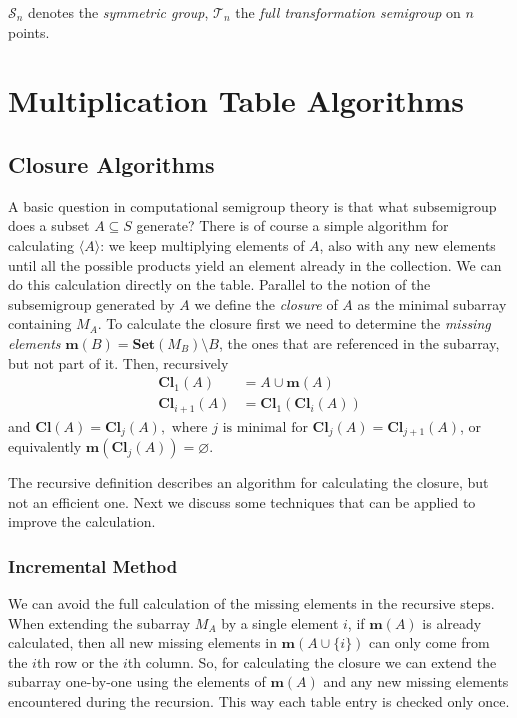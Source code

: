 \documentclass{amsart}
\newcommand{\cT}{{\mathcal T}}
\newcommand{\cS}{{\mathcal S}}
\newcommand{\Set}{\mathbf{Set}}
\newcommand{\Miss}{\mathbf{m}}
\newcommand{\Closure}{\mathbf{Cl}}
\theoremstyle{plain}
\theoremstyle{definition}
\begin{document}
$\cS_n$ denotes the \emph{symmetric group}, $\cT_n$ the \emph{full transformation semigroup} on $n$ points.

\section{Multiplication Table Algorithms}
\label{sec:multab}

\subsection{Closure Algorithms}
A basic question in computational semigroup theory is that what subsemigroup does a subset $A\subseteq S$ generate?
There is of course a simple algorithm for calculating $\langle A\rangle$: we keep multiplying elements of $A$, also with any new elements until all the possible products yield an element already in the collection.
We can do this calculation directly on the table. 
Parallel to the notion of the subsemigroup generated by $A$ we define the \emph{closure} of $A$ as the minimal subarray containing $M_A$.
To calculate the closure first we need to determine the \emph{missing elements} $\Miss(B)=\Set(M_B)\setminus B$, the ones that are referenced in the subarray, but not part of it.
Then, recursively
\begin{align*}
\Closure_1(A)&=A\cup\Miss(A)\\
\Closure_{i+1}(A)&=\Closure_1(\Closure_{i}(A))
\end{align*}
and
$ \Closure(A)=\Closure_j(A), \text{ where $j$ is minimal for }\Closure_j(A)=\Closure_{j+1}(A)$, or equivalently $\Miss(\Closure_j(A))=\varnothing$.

The recursive definition describes an algorithm for calculating the closure, but not an efficient one. Next we discuss some techniques that can be applied to improve the calculation.

\subsubsection{Incremental Method}
We can avoid the full calculation of the missing elements in the recursive steps.
When extending the subarray $M_A$ by a single element $i$, if $\Miss(A)$ is already calculated, then all new missing elements in $\Miss(A\cup\{i\})$ can only come from the $i$th row or the $i$th column.
So, for calculating the closure we can extend the subarray one-by-one using the elements of $\Miss(A)$ and any new missing elements encountered during the recursion.
This way each table entry is checked only once.
\end{document}
